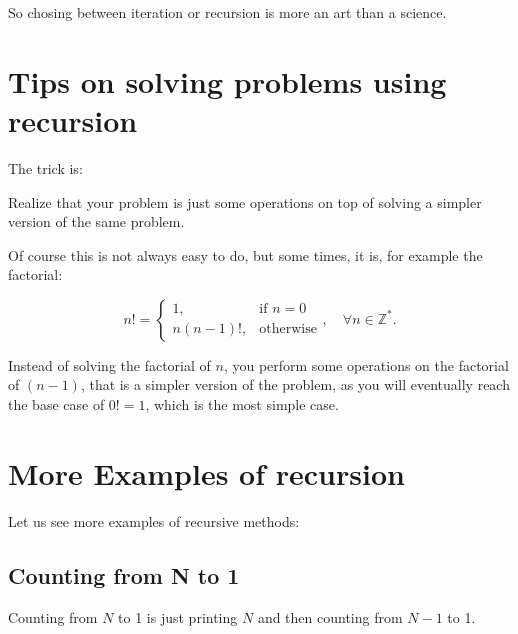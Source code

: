 \documentclass[a4paper, 9pt]{extarticle}
\begin{document}
So chosing between iteration or recursion is more an art than a science.





\section{Tips on solving problems using recursion}

The trick is:

\begin{blackboard}
Realize that your problem is just some operations on top of
solving a simpler version of the same problem.
\end{blackboard}

Of course this is not always easy to do, but some times, it is, for example the
factorial:

\begin{equation*}
  n! =
  \begin{cases}
    1,              & \text{if } n = 0\\
    n(n-1)!,    & \text{otherwise}
  \end{cases}, \quad \forall n \in \mathbb{Z}^{*}.
\end{equation*}

Instead of solving the factorial of $n$, you perform some operations on the
factorial of $(n-1)$, that is a simpler version of the problem, as you will
eventually reach the base case of $0! = 1$, which is the most simple case.




\section{More Examples of recursion}

Let us see more examples of recursive methods:


\subsection{Counting from N to 1}

\begin{multicols}{2}
\columnbreak
\end{multicols}

Counting from $N$ to 1 is just printing $N$ and then counting from $N-1$ to 1.
\end{document}
